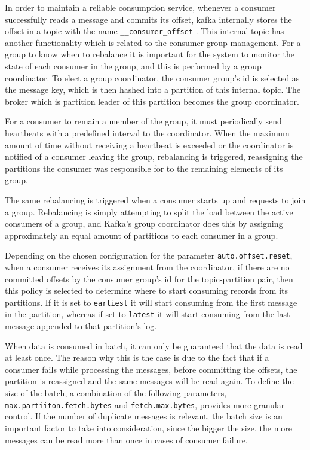 In order to maintain a reliable consumption service, whenever a consumer
successfully reads a message and commits its offset, kafka internally stores the
offset in a topic with the name \lstinline{__consumer_offset}
\cite{KafkaConsumer}. This internal topic has another functionality which is
related to the consumer group management. For a group to know when to rebalance
it is important for the system to monitor the state of each consumer in the
group, and this is performed by a group coordinator. To elect a group
coordinator, the consumer group's id is selected as the message key, which is
then hashed into a partition of this internal topic. The broker which is
partition leader of this partition becomes the group coordinator.

For a consumer to remain a member of the group, it must periodically send
heartbeats with a predefined interval to the coordinator. When the maximum
amount of time without receiving a heartbeat is exceeded or the coordinator is
notified of a consumer leaving the group, rebalancing is triggered, reassigning
the partitions the consumer was responsible for to the remaining elements of its
group.

The same rebalancing is triggered when a consumer starts up and requests to join
a group. Rebalancing is simply attempting to split the load between the active
consumers of a group, and Kafka's group coordinator does this by assigning
approximately an equal amount of partitions to each consumer in a group. 

Depending on the chosen configuration for the parameter
\lstinline{auto.offset.reset}, when a consumer receives its assignment from the
coordinator, if there are no committed offsets by the consumer group's id for
the topic-partition pair, then this policy is selected to determine where to
start consuming records from its partitions. If it is set to \lstinline{earliest}
it will start consuming from the first message in the partition, whereas if set to
\lstinline{latest} it will start consuming from the last message appended to that
partition's log.

When data is consumed in batch, it can only be guaranteed that the data is read
at least once. The reason why this is the case is due to the fact that if a
consumer fails while processing the messages, before committing the offsets, the
partition is reassigned and the same messages will be read again. To define the
size of the batch, a combination of the following parameters,
\lstinline{max.partiiton.fetch.bytes} and \lstinline{fetch.max.bytes}, provides
more granular control. If the number of duplicate messages is relevant, the
batch size is an important factor to take into consideration, since the bigger
the size, the more messages can be read more than once in cases of consumer
failure.

